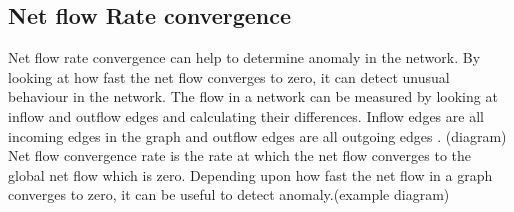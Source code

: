 %


\subsection{Net flow Rate convergence}
Net flow rate convergence can help to determine anomaly in the network. By looking at how 
fast the net flow converges to zero, it can detect unusual behaviour in the network. 
The flow in a network can be measured by looking at inflow and outflow edges and 
calculating their differences. Inflow edges are all incoming edges in the graph and 
outflow edges are all outgoing edges . (diagram) Net flow convergence rate is the rate at which the net flow converges to the global net flow which is zero. 
Depending upon how fast the net flow in a graph converges to zero, it can be useful to 
detect anomaly.(example diagram) 



